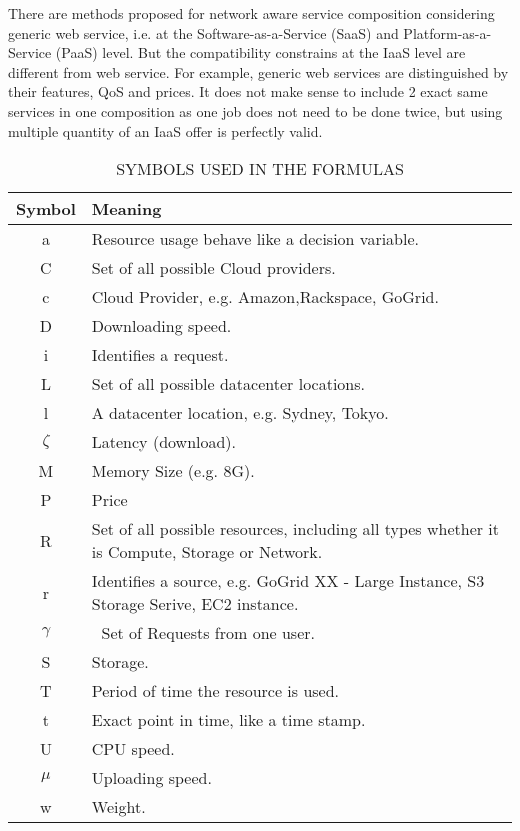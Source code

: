 \documentclass[journal]{IEEEtran}
\begin{document}
There are methods proposed for network aware service composition    \cite{yu2007efficient}   \cite{zeng2004qos}    \cite{zheng2013qos} considering generic web service, i.e. at the Software-as-a-Service (SaaS) and Platform-as-a-Service (PaaS) level. But the compatibility constrains at the IaaS level are different from web service. For example, generic web services are distinguished by their features, QoS and prices. It does not make sense to include 2 exact same services in one composition as one job does not need to be done twice, but using multiple quantity of an IaaS offer is perfectly valid.

\begin{table}[!h]
\begin{center}\caption{SYMBOLS USED IN THE FORMULAS} \label{table:formula_symbols}
\begin{tabular}{|c|p{6cm}|}
\hline
\textbf{Symbol }&  \textbf{Meaning  }  \\
\hline a & Resource usage behave like a decision variable. \\
\hline C & Set of all possible Cloud providers. \\
\hline c & Cloud Provider, e.g. Amazon,Rackspace, GoGrid. \\
\hline D & Downloading speed. \\
\hline i & Identifies a request. \\
\hline L & Set of all possible datacenter locations. \\
\hline l & A datacenter location, e.g. Sydney, Tokyo. \\
\hline $\zeta$ & Latency (download). \\
\hline  M & Memory Size (e.g. 8G). \\
\hline  P & Price \\
\hline  R & Set of all possible resources, including all types whether it is Compute, Storage or Network.\\
\hline  r & Identifies a source, e.g. GoGrid XX - Large Instance, S3 Storage Serive, EC2 instance.\\
\hline $\gamma $ & $\;$ Set of Requests from one user. \\
\hline  S & Storage. \\
\hline  T & Period of time the resource is used. \\
\hline  t & Exact point in time, like a time stamp. \\
\hline  U & CPU speed. \\
\hline $\mu$ & Uploading speed. \\
\hline w & Weight. \\
\hline
\end{tabular}
\end{center}
\end{table}
\end{document}
